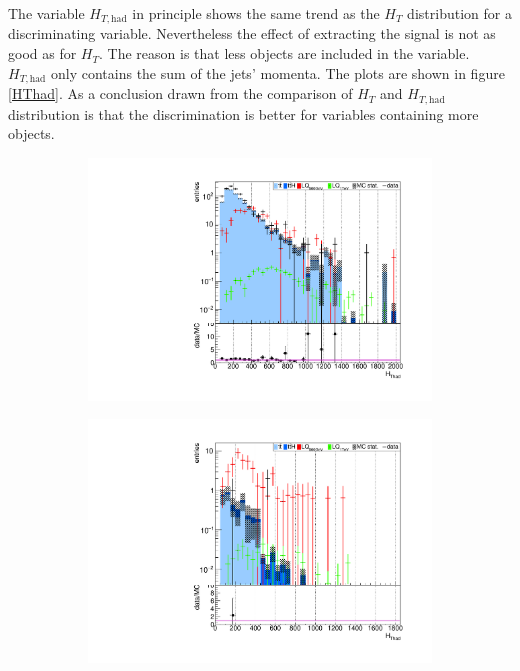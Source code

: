 %
The variable $H_{T,\text{had}}$ in principle shows the same trend as the $H_T$ distribution for a discriminating variable. Nevertheless the effect of extracting the signal is not as good as for $H_T$. The reason is that less objects are included in the variable. $H_{T,\text{had}}$ only contains the sum of the jets' momenta. The plots are shown in figure \ref{HThad}. As a conclusion drawn from the comparison of $H_T$ and $H_{T,\text{had}}$ distribution is that the discrimination is better for variables containing more objects. \par
%
\begin{figure}
  \centering
                \begin{subfigure}[t]{0.49\textwidth}
                \includegraphics[width=\textwidth]{figures/plots/kinLQ75/HThad_2j2b_1tau.pdf}
                \label{HThad:2b1tau}
                \end{subfigure}
                \begin{subfigure}[t]{0.49\textwidth}
                \includegraphics[width=\textwidth]{figures/plots/kinLQ75/HThad_2j2b_2tau.pdf}

\end{subfigure}
\end{figure}
